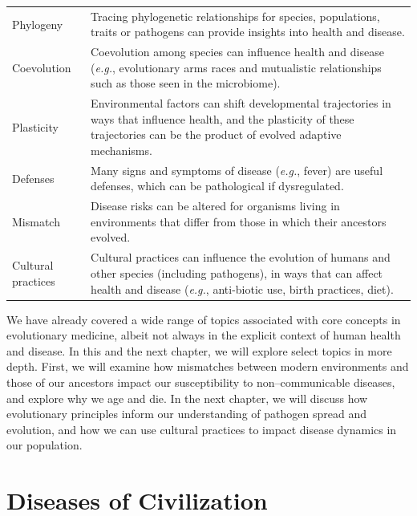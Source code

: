 \documentclass[
]{book}
\begin{document}
\begin{longtable}[]{@{}
  >{\raggedright\arraybackslash}p{}
  >{\raggedright\arraybackslash}p{}@{}}
Phylogeny & Tracing phylogenetic relationships for species, populations, traits or pathogens can provide insights into health and disease. \\
Coevolution & Coevolution among species can influence health and disease (\emph{e.g.}, evolutionary arms races and mutualistic relationships such as those seen in the microbiome). \\
Plasticity & Environmental factors can shift developmental trajectories in ways that influence health, and the plasticity of these trajectories can be the product of evolved adaptive mechanisms. \\
Defenses & Many signs and symptoms of disease (\emph{e.g.}, fever) are useful defenses, which can be pathological if dysregulated. \\
Mismatch & Disease risks can be altered for organisms living in environments that differ from those in which their ancestors evolved. \\
Cultural practices & Cultural practices can influence the evolution of humans and other species (including pathogens), in ways that can affect health and disease (\emph{e.g.}, anti-biotic use, birth practices, diet). \\
\bottomrule
\end{longtable}

We have already covered a wide range of topics associated with core concepts in evolutionary medicine, albeit not always in the explicit context of human health and disease. In this and the next chapter, we will explore select topics in more depth. First, we will examine how mismatches between modern environments and those of our ancestors impact our susceptibility to non--communicable diseases, and explore why we age and die. In the next chapter, we will discuss how evolutionary principles inform our understanding of pathogen spread and evolution, and how we can use cultural practices to impact disease dynamics in our population.

\hypertarget{diseases-of-civilization}{%
\section{Diseases of Civilization}\label{diseases-of-civilization}}
\end{document}
